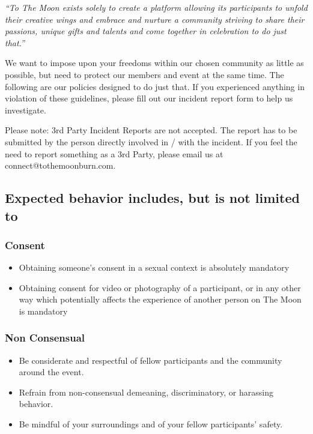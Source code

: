 \emph{“To The Moon exists solely to create a platform allowing its participants to unfold their creative wings and embrace and nurture a community striving to share their passions, unique gifts and talents and come together in celebration to do just that.”}

We want to impose upon your freedoms within our chosen community as little as possible, but need to protect our members and event at the same time.
The following are our policies designed to do just that.
If you experienced anything in violation of these guidelines, please fill out our incident report form to help us investigate.

Please note: 3rd Party Incident Reports are not accepted. The report has to be submitted by the person directly involved in / with the incident. If you feel the need to report something as a 3rd Party, please email us at connect@tothemoonburn.com.

\subsection*{Expected behavior includes, but is not limited to}

	\subsubsection*{Consent}
    \begin{itemize}[noitemsep]
    	\item Obtaining someone’s consent in a sexual context is absolutely mandatory
        \item Obtaining consent for video or photography of a participant, or in any other way which potentially affects the experience of another person on The Moon is mandatory
	\end{itemize}
        
    \subsubsection*{Non Consensual}
    \begin{itemize}[noitemsep]
        \item Be considerate and respectful of fellow participants and the community around the event.
        \item Refrain from non-consensual demeaning, discriminatory, or harassing behavior.
        \item Be mindful of your surroundings and of your fellow participants’ safety.
	\end{itemize}

